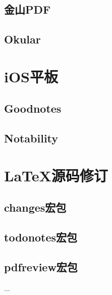 \documentclass[fontset = none, t, aspectratio=169]{ctexbeamer}
\begin{document}
\subsection{金山PDF}
\subsection{Okular}

\section{iOS平板}
\subsection{Goodnotes}
\subsection{Notability}

\section{\LaTeX 源码修订}
\subsection{changes宏包}
\subsection{todonotes宏包}
\subsection{pdfreview宏包}

\begin{frame}
  ...
\end{frame}
\end{document}
